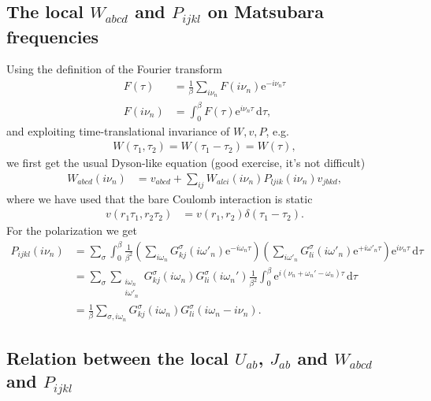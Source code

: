 \documentclass[12pt,a4paper]{scrartcl}
\numberwithin{equation}{section}
\begin{document}

\subsection{The local $W_{abcd}$ and $P_{ijkl}$ on Matsubara frequencies}
\label{sec:local_w_p_matsubara}
Using the definition of the Fourier transform
\begin{align}
 F(\tau)   &= \frac{1}{\beta} \sum_{i\nu_n} F(i\nu_n)\mathrm{e}^{-i\nu_n\tau} \\
 F(i\nu_n) &= \int_{0}^{\beta} F(\tau)\mathrm{e}^{i\nu_n\tau} \, \mathrm{d}\tau,
\end{align}
and exploiting time-translational invariance of $W,v,P$, e.g.
\begin{align}
 W(\tau_1,\tau_2) = W(\tau_1-\tau_2) = W(\tau),
\end{align}
we first get the usual Dyson-like equation (good exercise, it's not difficult)
\begin{align}
W_{abcd}(i\nu_n)
%
&= v_{abcd}  + \sum_{ ij }
                     W_{alci}(i\nu_n) P_{ljik}(i\nu_n)
                     v_{jbkd}, \label{eq:w_dyson_like}
\end{align}
where we have used that the bare Coulomb interaction is static
\begin{align}
 v(r_1\tau_1,r_2\tau_2) &= v(r_1,r_2) \delta(\tau_1-\tau_2).
\end{align}
For the polarization we get
\begin{align}
 P_{ijkl}(i\nu_n)
 &= \sum_{\sigma}\int_{0}^{\beta} \frac{1}{\beta^2}
      \left( \sum_{i\omega_n} G^{\sigma}_{kj}(i\omega'_n) \mathrm{e}^{-i\omega_n\tau} \right)
      \left( \sum_{i\omega'_n} G^{\sigma}_{li}(i\omega'_n) \mathrm{e}^{+i\omega'_n\tau} \right)
      \mathrm{e}^{i\nu_n\tau} \, \mathrm{d}\tau  \\
%
 &= \sum_{\sigma}\sum_{\substack{i\omega_n\\i\omega'_n}} G^{\sigma}_{kj}(i\omega_n)
                                            G^{\sigma}_{li}(i\omega_n')
      \frac{1}{\beta^2} \int_{0}^{\beta} \mathrm{e}^{i(\nu_n+\omega_n'-\omega_n) \tau}   \, \mathrm{d}\tau  \\
%
 &=\frac{1}{\beta} \sum_{\sigma,i\omega_n} G^{\sigma}_{kj}(i\omega_n)
                     G^{\sigma}_{li}(i\omega_n-i\nu_n).
\end{align}




\subsection{Relation between the local $U_{ab}$, $J_{ab}$ and $W_{abcd}$ and $P_{ijkl}$ }
\label{sec:local_gw_form_matsubara}
\end{document}
